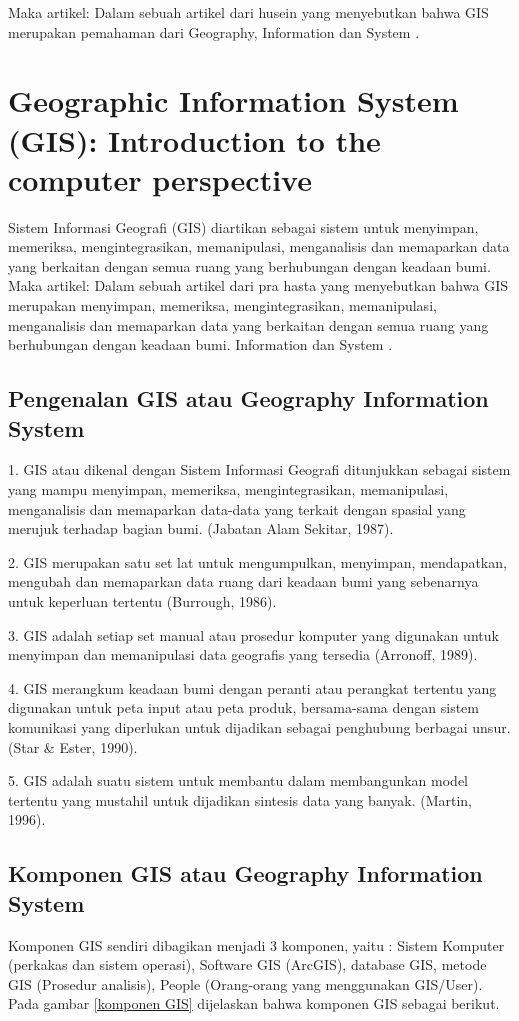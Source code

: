 Maka artikel:
	Dalam sebuah artikel dari husein yang menyebutkan bahwa  GIS merupakan pemahaman dari
	Geography, Information dan System \cite{husein2006konsep}.

\section{Geographic Information System (GIS): Introduction to the computer perspective}
Sistem Informasi Geografi (GIS) diartikan sebagai sistem untuk menyimpan, memeriksa, 
mengintegrasikan, memanipulasi, menganalisis dan memaparkan data yang berkaitan dengan semua 
ruang yang berhubungan dengan keadaan bumi.
Maka artikel:
	Dalam sebuah artikel dari pra hasta yang menyebutkan bahwa  GIS merupakan menyimpan, memeriksa, mengintegrasikan, memanipulasi, menganalisis dan memaparkan data yang berkaitan dengan semua ruang yang berhubungan dengan keadaan bumi. Information dan System \cite{prahasta2009sistem}.

\subsection{Pengenalan GIS atau Geography Information System}
1. GIS atau dikenal dengan Sistem Informasi Geografi ditunjukkan sebagai sistem yang mampu menyimpan, memeriksa, mengintegrasikan, memanipulasi, menganalisis dan memaparkan data-data yang terkait dengan spasial yang merujuk terhadap bagian bumi. (Jabatan Alam Sekitar, 1987).

2. GIS merupakan satu set lat untuk mengumpulkan, menyimpan, mendapatkan, mengubah dan memaparkan data ruang dari keadaan bumi yang sebenarnya untuk keperluan tertentu (Burrough, 1986).

3. GIS adalah setiap set manual atau prosedur komputer yang digunakan untuk menyimpan dan memanipulasi data geografis yang tersedia (Arronoff, 1989).

4. GIS merangkum keadaan bumi dengan peranti atau perangkat tertentu yang digunakan untuk peta input atau peta produk, bersama-sama dengan sistem komunikasi yang diperlukan untuk dijadikan sebagai penghubung berbagai unsur. (Star \& Ester, 1990).

5. GIS adalah suatu sistem untuk membantu dalam membangunkan model tertentu yang mustahil untuk dijadikan sintesis data yang banyak. (Martin, 1996).

\subsection{Komponen GIS atau Geography Information System}
Komponen GIS sendiri dibagikan menjadi 3 komponen, yaitu :
Sistem Komputer (perkakas dan sistem operasi), Software GIS
(ArcGIS), database GIS, metode GIS (Prosedur analisis), People (Orang-orang yang menggunakan GIS/User).
Pada gambar \ref{komponen GIS} dijelaskan bahwa komponen GIS sebagai berikut.

